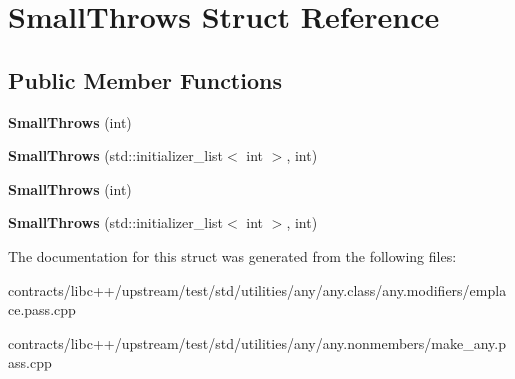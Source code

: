 \hypertarget{struct_small_throws}{}\section{Small\+Throws Struct Reference}
\label{struct_small_throws}
\subsection*{Public Member Functions}
\begin{DoxyCompactItemize}
\item 
\mbox{\label{struct_small_throws_a9f699a027bfd28cb326e9195c946b832}} 
{\bfseries Small\+Throws} (int)
\item 
\mbox{\label{struct_small_throws_a8c0b83eb72e4f4d4523f7d696f563896}} 
{\bfseries Small\+Throws} (std\+::initializer\+\_\+list$<$ int $>$, int)
\item 
\mbox{\label{struct_small_throws_a9f699a027bfd28cb326e9195c946b832}} 
{\bfseries Small\+Throws} (int)
\item 
\mbox{\label{struct_small_throws_a8c0b83eb72e4f4d4523f7d696f563896}} 
{\bfseries Small\+Throws} (std\+::initializer\+\_\+list$<$ int $>$, int)
\end{DoxyCompactItemize}


The documentation for this struct was generated from the following files\+:\begin{DoxyCompactItemize}
\item 
contracts/libc++/upstream/test/std/utilities/any/any.\+class/any.\+modifiers/emplace.\+pass.\+cpp\item 
contracts/libc++/upstream/test/std/utilities/any/any.\+nonmembers/make\+\_\+any.\+pass.\+cpp\end{DoxyCompactItemize}
